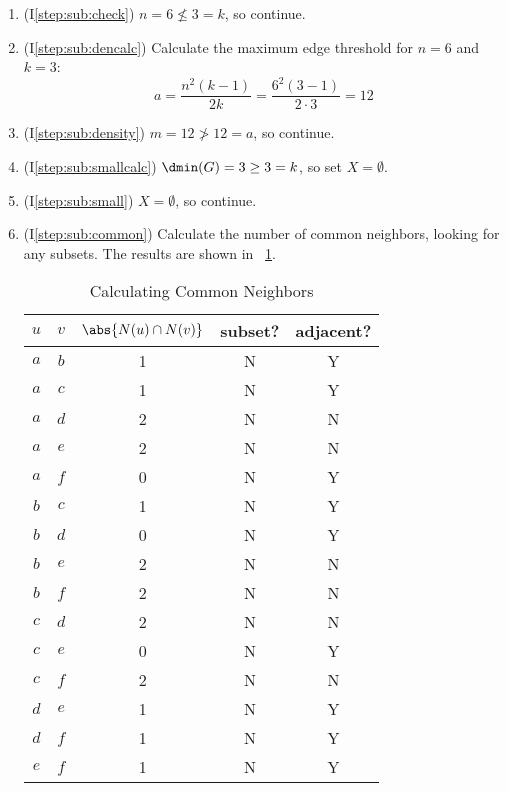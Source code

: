 \begin{enumerate}
\item (I\ref{step:sub:check}) \(n=6\nleq3=k\), so continue.

\item (I\ref{step:sub:dencalc}) Calculate the maximum edge threshold for \(n=6\) and \(k=3\):
  \[a=\frac{n^2(k-1)}{2k}=\frac{6^2(3-1)}{2\cdot3}=12\]

\item (I\ref{step:sub:density}) \(m=12\ngtr12=a\), so continue.

\item (I\ref{step:sub:smallcalc}) \(\dmin(G)=3\ge3=k\), so set \(X=\emptyset\).

\item (I\ref{step:sub:small}) \(X=\emptyset\), so continue.

\item (I\ref{step:sub:common}) Calculate the number of common neighbors, looking for any subsets.  The results are
  shown in \tablename~\ref{tab:common}.

  \begin{table}[H]
    \centering
    \caption{Calculating Common Neighbors}
    \label{tab:common}
    \begin{tabular}{|c|c|c|c|c|}
      \hline
      \(u\) & \(v\) & \(\abs{N(u)\cap N(v)}\) & subset? & adjacent? \\
      \hline
      \(a\) & \(b\) & 1 & N & Y \\
      \hline
      \(a\) & \(c\) & 1 & N & Y \\
      \hline
      \(a\) & \(d\) & 2 & N & N \\
      \hline
      \(a\) & \(e\) & 2 & N & N \\
      \hline
      \(a\) & \(f\) & 0 & N & Y \\
      \hline
      \(b\) & \(c\) & 1 & N & Y \\
      \hline
      \(b\) & \(d\) & 0 & N & Y \\
      \hline
      \(b\) & \(e\) & 2 & N & N \\
      \hline
      \(b\) & \(f\) & 2 & N & N \\
      \hline
      \(c\) & \(d\) & 2 & N & N \\
      \hline
      \(c\) & \(e\) & 0 & N & Y \\
      \hline
      \(c\) & \(f\) & 2 & N & N \\
      \hline
      \(d\) & \(e\) & 1 & N & Y \\
      \hline
      \(d\) & \(f\) & 1 & N & Y \\
      \hline
      \(e\) & \(f\) & 1 & N & Y \\
      \hline
    \end{tabular}
  \end{table}


\end{enumerate}
